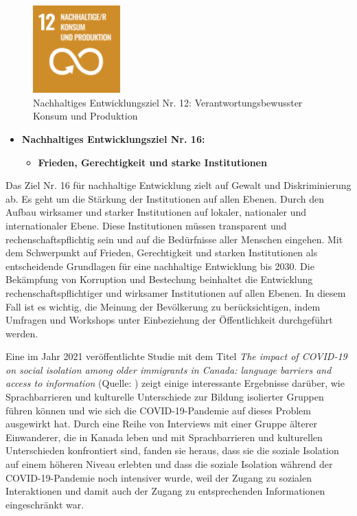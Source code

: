 \begin{figure}[H]
    \centering
    \includegraphics[width=0.3\textwidth]{pics/SDG-12.png}
    \caption{Nachhaltiges Entwicklungsziel Nr. 12: Verantwortungsbewusster Konsum und Produktion}
    \label{fig:SDG12}
\end{figure}

\begin{itemize}
    \item \textbf{Nachhaltiges Entwicklungsziel Nr. 16: }
          \begin{itemize}
              \item \textbf{Frieden, Gerechtigkeit und starke Institutionen}
          \end{itemize}
\end{itemize}

Das Ziel Nr. 16 für nachhaltige Entwicklung zielt auf Gewalt und Diskriminierung ab. Es geht um die Stärkung der Institutionen auf allen Ebenen. Durch den Aufbau wirksamer und starker Institutionen auf lokaler, nationaler und internationaler Ebene. Diese Institutionen müssen transparent und rechenschaftspflichtig sein und auf die Bedürfnisse aller Menschen eingehen. Mit dem Schwerpunkt auf Frieden, Gerechtigkeit und starken Institutionen als entscheidende Grundlagen für eine nachhaltige Entwicklung bis 2030. Die Bekämpfung von Korruption und Bestechung beinhaltet die Entwicklung rechenschaftspflichtiger und wirksamer Institutionen auf allen Ebenen. In diesem Fall ist es wichtig, die Meinung der Bevölkerung zu berücksichtigen, indem Umfragen und Workshops unter Einbeziehung der Öffentlichkeit durchgeführt werden.

Eine im Jahr 2021 veröffentlichte Studie mit dem Titel \textit{The impact of COVID-19 on social isolation among older immigrants in Canada: language barriers and access to information} (Quelle: ) zeigt einige interessante Ergebnisse darüber, wie Sprachbarrieren und kulturelle Unterschiede zur Bildung isolierter Gruppen führen können und wie sich die COVID-19-Pandemie auf dieses Problem ausgewirkt hat. Durch eine Reihe von Interviews mit einer Gruppe älterer Einwanderer, die in Kanada leben und mit Sprachbarrieren und kulturellen Unterschieden konfrontiert sind, fanden sie heraus, dass sie die soziale Isolation auf einem höheren Niveau erlebten und dass die soziale Isolation während der COVID-19-Pandemie noch intensiver wurde, weil der Zugang zu sozialen Interaktionen und damit auch der Zugang zu entsprechenden Informationen eingeschränkt war.

